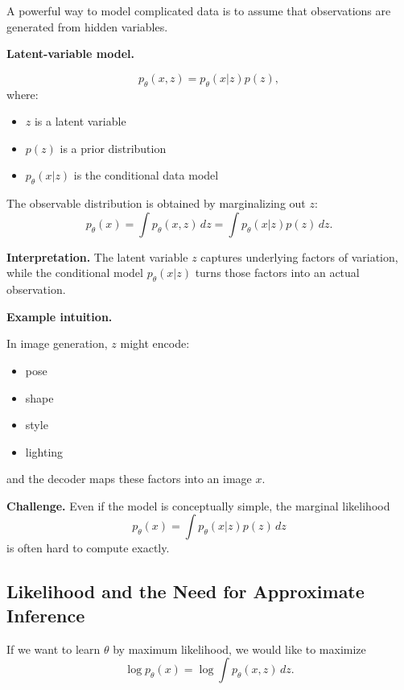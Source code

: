 A powerful way to model complicated data is to assume that observations are generated from hidden variables.

\medskip

\noindent
\textbf{Latent-variable model.}

\[
p_\theta(x,z) = p_\theta(x|z)p(z),
\]
where:
\begin{itemize}
    \item $z$ is a latent variable
    \item $p(z)$ is a prior distribution
    \item $p_\theta(x|z)$ is the conditional data model
\end{itemize}

\medskip

\noindent
The observable distribution is obtained by marginalizing out $z$:
\[
p_\theta(x) = \int p_\theta(x,z)\,dz
= \int p_\theta(x|z)p(z)\,dz.
\]

\medskip

\noindent
\textbf{Interpretation.}  
The latent variable $z$ captures underlying factors of variation, while the conditional model $p_\theta(x|z)$ turns those factors into an actual observation.

\medskip

\noindent
\textbf{Example intuition.}

In image generation, $z$ might encode:
\begin{itemize}
    \item pose
    \item shape
    \item style
    \item lighting
\end{itemize}

and the decoder maps these factors into an image $x$.

\medskip

\noindent
\textbf{Challenge.}  
Even if the model is conceptually simple, the marginal likelihood
\[
p_\theta(x)=\int p_\theta(x|z)p(z)\,dz
\]
is often hard to compute exactly.

\subsection{Likelihood and the Need for Approximate Inference}

If we want to learn $\theta$ by maximum likelihood, we would like to maximize
\[
\log p_\theta(x)
=
\log \int p_\theta(x,z)\,dz.
\]


